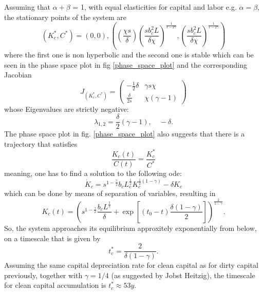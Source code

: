 Assuming that $\alpha + \beta$ = 1, with equal elasticities for capital and labor e.g. $\alpha = \beta$, the stationary points of the system are 
\begin{equation}
  (K_c^*, C^*) = (0,0), \left( \left( \frac{\chi s}{\delta} \right) \left( \frac{s b_c^2 L}{\delta \chi} \right)^{\frac{1}{1-2\gamma}}, \left( \frac{s b_c^2 L}{\delta \chi} \right)^{\frac{1}{1-2 \gamma}}  \right)
	\label{stationary_points}
\end{equation}
where the first one is non hyperbolic and the second one is stable which can be seen in the phase space plot in fig \ref{phase_space_plot} and the corresponding Jacobian
\begin{equation}
	J_{(K_c^*,C^*)} = 
		\begin{pmatrix}
			-\frac{1}{2}\delta & \gamma s \chi \\
			\frac{\delta}{2 s} & \chi \left(\gamma-1 \right)
		\end{pmatrix}
	\label{eq:learning_jacobian}
\end{equation}
whose Eigenvalues are strictly negative:
\begin{equation}
  \lambda_{1,2} = \frac{\delta}{2}(\gamma-1), \quad -\delta.
	\label{eq:learning_eigenvalues}
\end{equation}
The phase space plot in fig. \ref{phase_space_plot} also suggests that there is a trajectory that satisfies 
\begin{equation}
	\frac{K_c(t)}{C(t)} = \frac{K^*_c}{C^*}
\end{equation}
meaning, one has to find a solution to the following ode:
\begin{equation}
	\dot{K}_c = s^{1-\frac{\gamma}{2}} b_c L_c^{\frac{1}{2}}K_c^{\frac{1}{2}(1-\gamma)} - \delta K_c
	\label{eq:learning_trajectory_ode}
\end{equation}
which can be done by means of separation of variables, resulting in
\begin{equation}
  K_c(t) = \left( s^{1-\frac{\gamma}{2}}\frac{b_c L^{\frac{1}{2}}}{\delta} + \exp\left[ (t_0-t) \frac{\delta (1-\gamma)}{2} \right] \right)^{\frac{2}{1-\gamma}}.
	\label{eq:learning_trajectory_solution}
\end{equation}
So, the system approaches its equilibrium approxitely exponentially from below, on a timescale that is given by
\begin{equation}
	t_c^* = \frac{2}{\delta(1-\gamma)}
	\label{eq_learning_equilibrium_timescale}.
\end{equation}
Assuming the same capital depreciation rate for clean capital as for dirty capital previously, together with $\gamma = 1/4$ (as suggested by Jobst Heitzig), the timescale for clean capital accumulation is $t^*_c \approx 53 y$.




